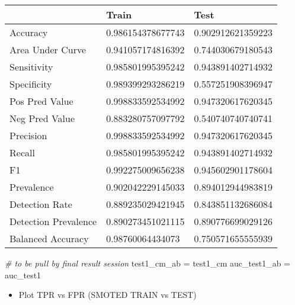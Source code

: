\documentclass[
]{article}
\newenvironment{Shaded}{\begin{snugshade}}{\end{snugshade}}
\newcommand{\CommentTok}[1]{\textcolor[rgb]{0.56,0.35,0.01}{\textit{#1}}}
\newcommand{\NormalTok}[1]{#1}
\newcommand{\StringTok}[1]{\textcolor[rgb]{0.31,0.60,0.02}{#1}}
\providecommand{\tightlist}{%
  \setlength{\itemsep}{0pt}\setlength{\parskip}{0pt}}
\begin{document}
\begin{table}[H]
\centering
\begin{tabular}{l|l|l}
\hline
  & Train & Test\\
\hline
Accuracy & 0.986154378677743 & 0.902912621359223\\
\hline
Area Under Curve & 0.941057174816392 & 0.744030679180543\\
\hline
Sensitivity & 0.985801995395242 & 0.943891402714932\\
\hline
Specificity & 0.989399293286219 & 0.557251908396947\\
\hline
Pos Pred Value & 0.998833592534992 & 0.947320617620345\\
\hline
Neg Pred Value & 0.883280757097792 & 0.540740740740741\\
\hline
Precision & 0.998833592534992 & 0.947320617620345\\
\hline
Recall & 0.985801995395242 & 0.943891402714932\\
\hline
F1 & 0.992275009656238 & 0.945602901178604\\
\hline
Prevalence & 0.902042229145033 & 0.894012944983819\\
\hline
Detection Rate & 0.889235029421945 & 0.843851132686084\\
\hline
Detection Prevalence & 0.890273451021115 & 0.890776699029126\\
\hline
Balanced Accuracy & 0.98760064434073 & 0.750571655555939\\
\hline
\end{tabular}
\end{table}

\begin{Shaded}
\begin{Highlighting}[]
\CommentTok{# to be pull by final result session}
\NormalTok{test1_cm_ab =}\StringTok{ }\NormalTok{test1_cm}
\NormalTok{auc_test1_ab =}\StringTok{ }\NormalTok{auc_test1}
\end{Highlighting}
\end{Shaded}

\begin{itemize}
\tightlist
\item
  Plot TPR vs FPR (SMOTED TRAIN vs TEST)
\end{itemize}
\end{document}
